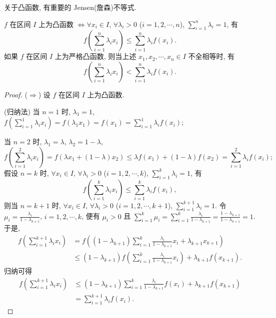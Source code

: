关于凸函数, 有重要的 Jensen(詹森)不等式.

\begin{theorem}\label{thm:3.6.2}
$f$ 在区间 $I$ 上为凸函数 $\Longleftrightarrow \forall x_{i}\in I$, $\forall \lambda_{i}>0$ ($i=1,2,\cdots,n$), $\sum_{i=1}^{n}\lambda_{i}=1$, 有
\[
f\left(\sum_{i=1}^{n}\lambda_{i}x_{i}\right)\leqslant \sum_{i=1}^{n}\lambda_{i}f(x_{i}).
\]
如果 $f$ 在区间 $I$ 上为严格凸函数, 则当上述 $x_{1},x_{2},\cdots,x_{n}\in I$ 不全相等时, 有
\[
f\left(\sum_{i=1}^{n}\lambda_{i}x_{i}\right)< \sum_{i=1}^{n}\lambda_{i}f(x_{i}).
\]
\end{theorem}

\begin{proof}
($\Longrightarrow$) 设 $f$ 在区间 $I$ 上为凸函数.

(归纳法) 当 $n=1$ 时, $\lambda_{1}=1$, $f\left(\sum_{i=1}^{1}\lambda_{i}x_{i}\right)=f(\lambda_{1}x_{1})=f(x_{1})=\sum_{i=1}^{1}\lambda_{i}f(x_{i})$;

当 $n=2$ 时, $\lambda_{1}=\lambda$, $\lambda_{2}=1-\lambda$,
\[
f\left(\sum_{i=1}^{2}\lambda_{i}x_{i}\right)=f(\lambda x_{1}+(1-\lambda)x_{2})\leqslant \lambda f(x_{1})+(1-\lambda)f(x_{2})=\sum_{i=1}^{2}\lambda_{i}f(x_{i});
\]
假设 $n=k$ 时, $\forall x_{i}\in I$, $\forall \lambda_{i}>0$ ($i=1,2,\cdots,k$), $\sum_{i=1}^{k}\lambda_{i}=1$, 有
\[
f\left(\sum_{i=1}^{k}\lambda_{i}x_{i}\right)\leqslant \sum_{i=1}^{k}\lambda_{i}f(x_{i}),
\]
则当 $n=k+1$ 时, $\forall x_{i}\in I$, $\forall \lambda_{i}>0$ ($i=1,2,\cdots,k+1$), $\sum_{i=1}^{k+1}\lambda_{i}=1$. 令 $\mu_{i}=\frac{\lambda_{i}}{1-\lambda_{k+1}}$, $i=1,2,\cdots,k$, 便有 $\mu_{i}>0$ 且 $\sum_{i=1}^{k}\mu_{i}=\sum_{i=1}^{k}\frac{\lambda_{i}}{1-\lambda_{k+1}}=\frac{1-\lambda_{k+1}}{1-\lambda_{k+1}}=1$. 于是,
\begin{align*}
f\left(\sum_{i=1}^{k+1}\lambda_{i}x_{i}\right)&=f\left((1-\lambda_{k+1})\sum_{i=1}^{k}\frac{\lambda_{i}}{1-\lambda_{k+1}}x_{i}+\lambda_{k+1}x_{k+1}\right)\\
&\leqslant (1-\lambda_{k+1})f\left(\sum_{i=1}^{k}\frac{\lambda_{i}}{1-\lambda_{k+1}}x_{i}\right)+\lambda_{k+1}f(x_{k+1}).
\end{align*}
归纳可得
\begin{align*}
f\left(\sum_{i=1}^{k+1}\lambda_{i}x_{i}\right)&\leqslant (1-\lambda_{k+1})\sum_{i=1}^{k}\frac{\lambda_{i}}{1-\lambda_{k+1}}f(x_{i})+\lambda_{k+1}f(x_{k+1})\\
&=\sum_{i=1}^{k+1}\lambda_{i}f(x_{i}).
\end{align*}


\end{proof}
